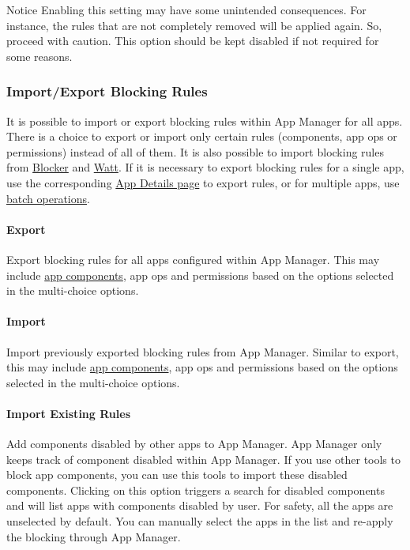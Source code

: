 \begin{warning}{Notice}
    Enabling this setting may have some unintended consequences.
    For instance, the rules that are not completely removed will be applied again.
    So, proceed with caution.
    This option should be kept disabled if not required for some reasons.
\end{warning}


\subsubsection{Import/Export Blocking Rules}
It is possible to import or export blocking rules within App Manager for all apps.
There is a choice to export or import only certain rules (components, app ops or permissions) instead of all of them.
It is also possible to import blocking rules from \href{https://github.com/lihenggui/blocker}{Blocker} and
\href{https://github.com/tuyafeng/Watt}{Watt}.
If it is necessary to export blocking rules for a single app, use the corresponding \hyperref[sec:app-details-page]{App
Details page} to export rules, or for multiple apps, use \hyperref[subsec:batch-operations]{batch operations}.


\paragraph{Export} Export blocking rules for all apps configured within App Manager.
This may include \hyperref[subsec:faq:what-are-app-components]{app components}, app ops and permissions based on the
options selected in the multi-choice options.

\paragraph{Import} Import previously exported blocking rules from App Manager.
Similar to export, this may include \hyperref[subsec:faq:what-are-app-components]{app components}, app ops and
permissions based on the options selected in the multi-choice options.

\paragraph{Import Existing Rules}\label{par:import-existing-rules}
Add components disabled by other apps to App Manager.
App Manager only keeps track of component disabled within App Manager.
If you use other tools to block app components, you can use this tools to import these disabled components.
Clicking on this option triggers a search for disabled components and will list apps with components disabled by user.
For safety, all the apps are unselected by default.
You can manually select the apps in the list and re-apply the blocking through App Manager.

